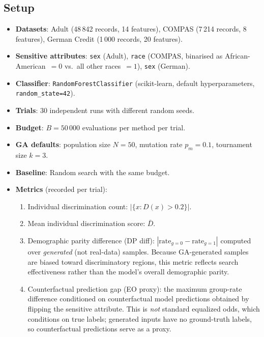 \documentclass[10pt]{article}
\begin{document}
\subsection{Setup}\label{sec:setup}
\begin{itemize}
    \item \textbf{Datasets}: Adult (48\,842 records, 14 features), COMPAS
          (7\,214 records, 8 features), German Credit (1\,000 records, 20 features).
    \item \textbf{Sensitive attributes}: \texttt{sex} (Adult),
          \texttt{race} (COMPAS, binarised as African-American~$=0$ vs.\ all
          other races~$=1$), \texttt{sex} (German).
    \item \textbf{Classifier}: \texttt{RandomForestClassifier} (scikit-learn,
          default hyperparameters, \texttt{random\_state=42}).
    \item \textbf{Trials}: 30 independent runs with different random seeds.
    \item \textbf{Budget}: $B = 50\,000$ evaluations per method per trial.
    \item \textbf{GA defaults}: population size $N{=}50$, mutation rate
          $p_m{=}0.1$, tournament size $k{=}3$.
    \item \textbf{Baseline}: Random search with the same budget.
    \item \textbf{Metrics} (recorded per trial):
    \begin{enumerate}
        \item Individual discrimination count:
              $|\{x : D(x) > 0.2\}|$.
        \item Mean individual discrimination score:
              $\bar{D}$.
        \item Demographic parity difference (DP diff):
              $|\text{rate}_{g=0} - \text{rate}_{g=1}|$ computed over
              \emph{generated} (not real-data) samples.  Because GA-generated
              samples are biased toward discriminatory regions, this metric
              reflects search effectiveness rather than the model's overall
              demographic parity.
        \item Counterfactual prediction gap (EO proxy):
              the maximum group-rate difference conditioned on counterfactual
              model predictions obtained by flipping the sensitive attribute.
              This is \emph{not} standard equalized odds, which conditions on
              true labels; generated inputs have no ground-truth labels, so
              counterfactual predictions serve as a proxy.
    \end{enumerate}
\end{itemize}
\end{document}
